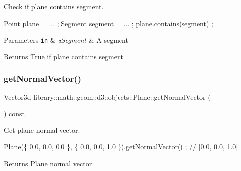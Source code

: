 Check if plane contains segment. 


\begin{DoxyCode}
Point plane = ... ;
Segment segment = ... ;
plane.contains(segment) ;
\end{DoxyCode}



\begin{DoxyParams}[1]{Parameters}
\mbox{\tt in}  & {\em a\+Segment} & A segment \\
\hline
\end{DoxyParams}
\begin{DoxyReturn}{Returns}
True if plane contains segment 
\end{DoxyReturn}
\mbox{\label{classlibrary_1_1math_1_1geom_1_1d3_1_1objects_1_1_plane_a9d34608a389d4c80dad6b6f58b82c0e4}} 
\subsubsection{\texorpdfstring{get\+Normal\+Vector()}{getNormalVector()}}
{\footnotesize\ttfamily Vector3d library\+::math\+::geom\+::d3\+::objects\+::\+Plane\+::get\+Normal\+Vector (\begin{DoxyParamCaption}{ }\end{DoxyParamCaption}) const}



Get plane normal vector. 


\begin{DoxyCode}
\hyperlink{classlibrary_1_1math_1_1geom_1_1d3_1_1objects_1_1_plane_a81fe78a983e2cb6ee6ad9bfabd22c3a4}{Plane}(\{ 0.0, 0.0, 0.0 \}, \{ 0.0, 0.0, 1.0 \}).\hyperlink{classlibrary_1_1math_1_1geom_1_1d3_1_1objects_1_1_plane_a9d34608a389d4c80dad6b6f58b82c0e4}{getNormalVector}() ; \textcolor{comment}{// [0.0, 0.0, 1.0]}
\end{DoxyCode}


\begin{DoxyReturn}{Returns}
\hyperlink{classlibrary_1_1math_1_1geom_1_1d3_1_1objects_1_1_plane}{Plane} normal vector 
\end{DoxyReturn}
\mbox{\label{classlibrary_1_1math_1_1geom_1_1d3_1_1objects_1_1_plane_a52f9167ca123019c4b303c19b696b886}} 
